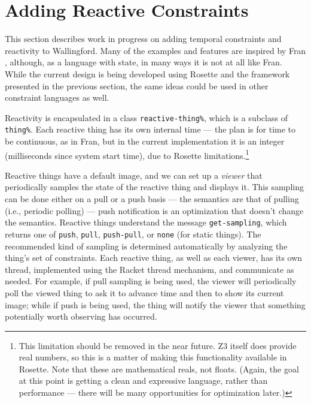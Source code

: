 \documentclass{sigplanconf}
\begin{document}

\section{Adding Reactive Constraints}
\label{sec:reactive}

This section describes work in progress on adding temporal constraints and
reactivity to Wallingford.  Many of the examples and features are inspired
by Fran \cite{elliot-icfp-1997}, although, as a language with state, in
many ways it is not at all like Fran.  While the current design is being
developed using Rosette and the framework presented in the previous
section, the same ideas could be used in other constraint languages as
well.

Reactivity is encapsulated in a class \verb|reactive-thing%|, which is
a subclass of \verb|thing%|.  Each reactive thing has its own internal
time --- the plan is for time to be continuous, as in Fran, but in the
current implementation it is an integer (milliseconds since system
start time), due to Rosette limitations.\footnote{This limitation
  should be removed in the near future.  Z3 itself does provide real
  numbers, so this is a matter of making this functionality available
  in Rosette.  Note that these are mathematical reals, not floats.
  (Again, the goal at this point is getting a clean and expressive
  language, rather than performance --- there will be many
  opportunities for optimization later.)}

Reactive things have a default image, and we can set up a
\emph{viewer} that periodically samples the state of the reactive
thing and displays it.  This sampling can be done either on a pull or
a push basis --- the semantics are that of pulling (i.e., periodic
polling) --- push notification is an optimization that doesn't change
the semantics.  Reactive things understand the message
\verb|get-sampling|, which returns one of \verb|push|, \verb|pull|,
\verb|push-pull|, or \verb|none| (for static things).  The recommended
kind of sampling is determined automatically by analyzing the thing's
set of constraints.  Each reactive thing, as well as each viewer, has
its own thread, implemented using the Racket thread mechanism, and
communicate as needed.  For example, if pull sampling is being used,
the viewer will periodically poll the viewed thing to ask it to
advance time and then to show its current image; while if push is
being used, the thing will notify the viewer that something
potentially worth observing has occurred.
\end{document}
